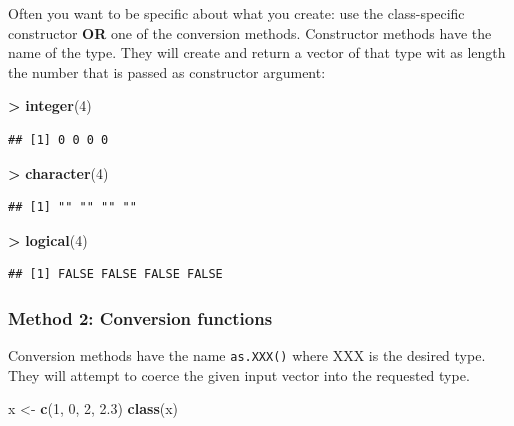 \documentclass[]{book}
\newenvironment{Shaded}{\begin{snugshade}}{\end{snugshade}}
\newcommand{\DecValTok}[1]{\textcolor[rgb]{0.00,0.00,0.81}{#1}}
\newcommand{\FloatTok}[1]{\textcolor[rgb]{0.00,0.00,0.81}{#1}}
\newcommand{\KeywordTok}[1]{\textcolor[rgb]{0.13,0.29,0.53}{\textbf{#1}}}
\newcommand{\NormalTok}[1]{#1}
\newcommand{\OperatorTok}[1]{\textcolor[rgb]{0.81,0.36,0.00}{\textbf{#1}}}
\newcommand{\StringTok}[1]{\textcolor[rgb]{0.31,0.60,0.02}{#1}}
\begin{document}
Often you want to be specific about what you create: use the class-specific constructor \textbf{OR} one of the conversion methods. Constructor methods have the name of the type. They will create and return a vector of that type wit as length the number that is passed as constructor argument:

\begin{Shaded}
\begin{Highlighting}[]
\OperatorTok{>}\StringTok{ }\KeywordTok{integer}\NormalTok{(}\DecValTok{4}\NormalTok{)}
\end{Highlighting}
\end{Shaded}

\begin{verbatim}
## [1] 0 0 0 0
\end{verbatim}

\begin{Shaded}
\begin{Highlighting}[]
\OperatorTok{>}\StringTok{ }\KeywordTok{character}\NormalTok{(}\DecValTok{4}\NormalTok{)}
\end{Highlighting}
\end{Shaded}

\begin{verbatim}
## [1] "" "" "" ""
\end{verbatim}

\begin{Shaded}
\begin{Highlighting}[]
\OperatorTok{>}\StringTok{ }\KeywordTok{logical}\NormalTok{(}\DecValTok{4}\NormalTok{)}
\end{Highlighting}
\end{Shaded}

\begin{verbatim}
## [1] FALSE FALSE FALSE FALSE
\end{verbatim}

\hypertarget{method-2-conversion-functions}{%
\subsubsection*{Method 2: Conversion functions}\label{method-2-conversion-functions}}

Conversion methods have the name \texttt{as.XXX()} where XXX is the desired type. They will attempt to coerce the given input vector into the requested type.

\begin{Shaded}
\begin{Highlighting}[]
\NormalTok{x <-}\StringTok{ }\KeywordTok{c}\NormalTok{(}\DecValTok{1}\NormalTok{, }\DecValTok{0}\NormalTok{, }\DecValTok{2}\NormalTok{, }\FloatTok{2.3}\NormalTok{)}
\KeywordTok{class}\NormalTok{(x)}
\end{Highlighting}
\end{Shaded}
\end{document}
